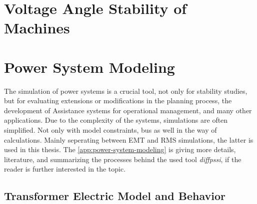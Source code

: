 \section{Voltage Angle Stability of Machines}


\section{Power System Modeling}

The simulation of power systems is a crucial tool, not only for stability studies, but for evaluating extensions or modifications in the planning process, the development of Assistance systems for operational management, and many other applications. \quelle 
Due to the complexity of the systems, simulations are often simplified. 
Not only with model constraints, bus as well in the way of calculations. 
Mainly seperating between \acf{EMT} and \acf{RMS} simulations, the latter is used in this thesis. 
The \autoref{app:power-system-modeling} is giving more details, literature, and summarizing the processes behind the used tool \textit{diffpssi}, if the reader is further interested in the topic.

\subsection{Transformer Electric Model and Behavior}
\label{sec:trafo-model}


